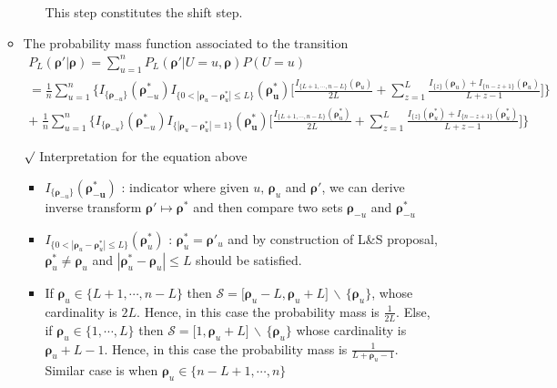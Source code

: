 \documentclass[12pt]{article}
\newcommand{\rmk}{$\surd$}
\newcommand{\diff}{\,\backslash\,}
\begin{document}
\begin{itemize}
\begin{itemize}
\begin{enumerate}
            This step constitutes the shift step.
        \end{enumerate}
        \item The probability mass function associated to the transition
        \begin{multline*}
            P_L(\boldsymbol{\rho}'|\boldsymbol{\rho}) = \sum_{u=1}^n P_L(\boldsymbol{\rho}'|U=u, \boldsymbol{\rho})P(U=u) \\ = \frac{1}{n}\sum_{u=1}^n\bigg\{I_{\{\boldsymbol{\rho}_{-u}\}}(\boldsymbol{\rho}_{-u}^*)I_{\{0<|\boldsymbol{\rho}_u-\boldsymbol{\rho}_u^*|\leq L\}}(\boldsymbol{\rho_u^*}) \Big[\frac{I_{\{L+1,\cdots, n-L\}}(\boldsymbol{\rho}_u)}{2L}+\sum_{z=1}^L \frac{I_{\{z\}}(\boldsymbol{\rho}_u)+I_{\{n-z+1\}}(\boldsymbol{\rho}_u)}{L+z-1} \Big]\bigg\} \\ +\; \frac{1}{n}\sum_{u=1}^n\bigg\{I_{\{\boldsymbol{\rho}_{-u}\}}(\boldsymbol{\rho}_{-u}^*)I_{\{|\boldsymbol{\rho}_u-\boldsymbol{\rho}_u^*|=1\}}(\boldsymbol{\rho_u^*}) \Big[\frac{I_{\{L+1,\cdots, n-L\}}(\boldsymbol{\rho}_u^*)}{2L}+\sum_{z=1}^L \frac{I_{\{z\}}(\boldsymbol{\rho}_u^*)+I_{\{n-z+1\}}(\boldsymbol{\rho}_u^*)}{L+z-1} \Big]\bigg\}
        \end{multline*}
        \item[\rmk] Interpretation for the equation above
        \begin{itemize}
            \item $ I_{\{\boldsymbol{\rho}_{-u}\}}(\boldsymbol{\rho_{-u}^*}) $ : indicator where given $u, \,\boldsymbol{\rho}_u$ and $\boldsymbol{\rho}'$, we can derive inverse transform $\boldsymbol{\rho}'\mapsto \boldsymbol{\rho}^*$ and then compare two sets $\boldsymbol{\rho}_{-u}$ and $\boldsymbol{\rho}_{-u}^*$
            \item $I_{\{0<|\boldsymbol{\rho}_u-\boldsymbol{\rho}_u^*|\leq L\}}(\boldsymbol{\rho}_u^*)$ : $\boldsymbol{\rho}_u^*=\boldsymbol{\rho}'_u$ and by construction of L\&S proposal, $\boldsymbol{\rho}_u^*\neq \boldsymbol{\rho}_u$ and $|\boldsymbol{\rho}_u^*-\boldsymbol{\rho}_u|\leq L$ should be satisfied. 
            \item If $\boldsymbol{\rho}_u\in \{L+1, \cdots, n-L\}$ then $\mathcal{S}=\big[\boldsymbol{\rho}_u-L, \boldsymbol{\rho}_u+L\big]\diff\{\boldsymbol{\rho}_u\}$, whose cardinality is $2L$. Hence, in this case the probability mass is $\frac{1}{2L}$. Else, if $\boldsymbol{\rho}_u\in \{1, \cdots, L\}$ then $\mathcal{S}=\big[1, \boldsymbol{\rho}_u+L\big]\diff\{\boldsymbol{\rho}_u\}$ whose cardinality is $\boldsymbol{\rho}_u+L-1$. Hence, in this case the probability mass is $\frac{1}{L+\boldsymbol{\rho}_u-1}$. Similar case is when $\boldsymbol{\rho}_u\in \{n-L+1, \cdots, n\}$ 

\end{itemize}
\end{itemize}
\end{itemize}
\end{document}
